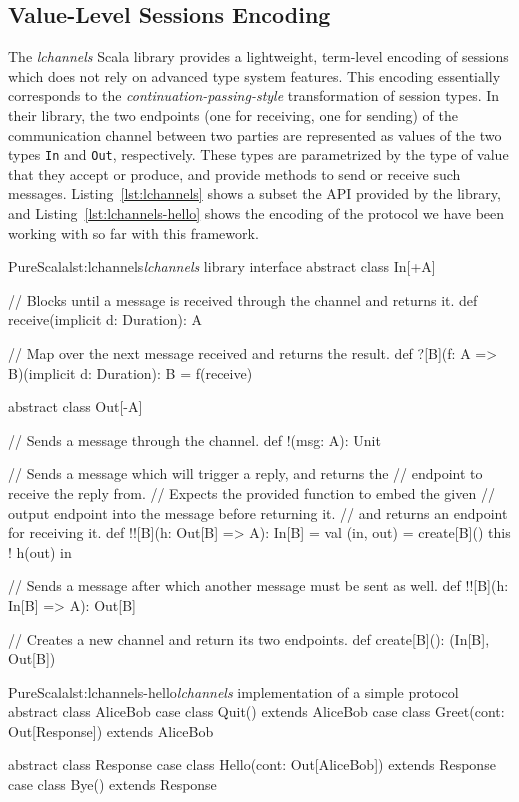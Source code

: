 \documentclass[a4paper,twoside]{article}
\newcommand{\RefCode}[1]{Listing~\ref{#1}}
\newcommand{\stt}[1]{\texttt{\small{#1}}}
\begin{document}
\subsection{Value-Level Sessions Encoding}

The \textit{lchannels} Scala library \cite{lchannels} provides a lightweight, term-level encoding of sessions which does not rely on advanced type system features. This encoding essentially corresponds to the \textit{continuation-passing-style} transformation of session types. In their library, the two endpoints (one for receiving, one for sending) of the communication channel between two parties are represented as values of the two types \stt{In} and \stt{Out}, respectively. These types are parametrized by the type of value that they accept or produce, and provide methods to send or receive such messages. \RefCode{lst:lchannels} shows a subset the API provided by the library, and \RefCode{lst:lchannels-hello} shows the encoding of the protocol we have been working with so far with this framework.

\begin{Code}{PureScala}{lst:lchannels}{\textit{lchannels} library interface}
abstract class In[+A] {
  // Blocks until a message is received through the channel and returns it.
  def receive(implicit d: Duration): A
  
  // Map over the next message received and returns the result.
  def ?[B](f: A => B)(implicit d: Duration): B = {
    f(receive)
  }
}

abstract class Out[-A] {
  // Sends a message through the channel.
  def !(msg: A): Unit

  // Sends a message which will trigger a reply, and returns the
  // endpoint to receive the reply from.
  // Expects the provided function to embed the given
  // output endpoint into the message before returning it.
  // and returns an endpoint for receiving it.
  def !![B](h: Out[B] => A): In[B] = {
    val (in, out) = create[B]()
    this ! h(out)
    in
  }
  
  // Sends a message after which another message must be sent as well.
  def !![B](h: In[B] => A): Out[B]

  // Creates a new channel and return its two endpoints.
  def create[B](): (In[B], Out[B])
}
\end{Code}

\begin{Code}{PureScala}{lst:lchannels-hello}{\textit{lchannels} implementation of a simple protocol}
abstract class AliceBob
case class Quit()                     extends AliceBob
case class Greet(cont: Out[Response]) extends AliceBob

abstract class Response
case class Hello(cont: Out[AliceBob]) extends Response
case class Bye()                      extends Response\
\end{Code}
\end{document}
